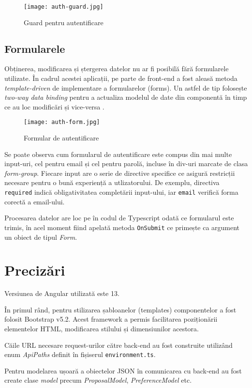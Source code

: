 \begin{figure}[H]
	\centering
	\texttt{[image: auth-guard.jpg]}
	\caption{Guard pentru autentificare}
\end{figure}

\subsection{Formularele}

Obținerea, modificarea și ștergerea datelor nu ar fi posibilă fără formularele utilizate. În cadrul acestei aplicații, pe parte de front-end a fost aleasă metoda \textit{template-driven} de implementare a formularelor (forms). Un astfel de tip folosește \textit{two-way data binding} pentru a actualiza modelul de date din componentă în timp ce au loc modificări și vice-versa \cite{angular-td-forms}.

\begin{figure}[H]
	\centering
	\texttt{[image: auth-form.jpg]}
	\caption{Formular de autentificare}
\end{figure}

Se poate observa cum formularul de autentificare este compus din mai multe input-uri, cel pentru email și cel pentru parolă, incluse în div-uri marcate de clasa \textit{form-group}. Fiecare input are o serie de directive specifice ce asigură restricții necesare pentru o bună experiență a utlizatorului. De exemplu, directiva \texttt{required} indică obligativitatea completării input-ului, iar \texttt{email} verifică forma corectă a email-ului.

Procesarea datelor are loc pe în codul de Typescript odată ce formularul este trimis, în acel moment fiind apelată metoda \texttt{OnSubmit} ce primește ca argument un obiect de tipul \textit{Form}.

\section{Precizări}

Versiunea de Angular utilizată este 13.

În primul rând, pentru stilizarea șabloanelor (templates) componentelor a fost folosit Bootstrap v5.2. Acest framework a permis facilitarea poziționării elementelor HTML, modificarea stilului și dimensiunilor acestora.

Căile URL necesare request-urilor către back-end au fost construite utilizând enum \textit{ApiPaths} definit în fișiserul \texttt{environment.ts}.

Pentru modelarea ușoară a obiectelor JSON în comunicarea cu back-end au fost create clase \textit{model} precum \textit{ProposalModel}, \textit{PreferenceModel} etc.